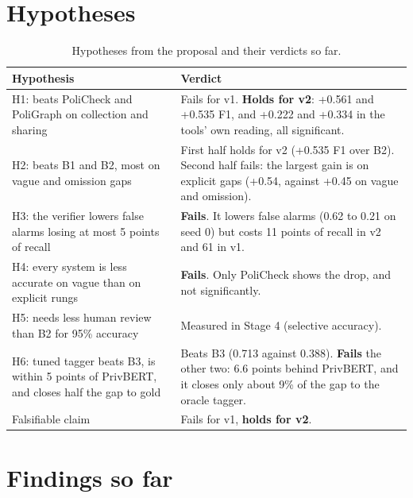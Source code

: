 \documentclass[11pt,a4paper]{article}
\begin{document}
\section{Hypotheses}
\label{sec:hyp}

\begin{table}[H]
\centering
\small
\begin{tabular}{p{6.6cm}p{8.2cm}}
\toprule
Hypothesis & Verdict \\
\midrule
H1: beats PoliCheck and PoliGraph on collection and sharing &
Fails for v1. \textbf{Holds for v2}: +0.561 and +0.535 F1, and +0.222 and +0.334 in the tools'
own reading, all significant. \\
H2: beats B1 and B2, most on vague and omission gaps &
First half holds for v2 (+0.535 F1 over B2). Second half fails: the largest gain is on explicit
gaps (+0.54, against +0.45 on vague and omission). \\
H3: the verifier lowers false alarms losing at most 5 points of recall &
\textbf{Fails}. It lowers false alarms (0.62 to 0.21 on seed 0) but costs 11 points of recall in
v2 and 61 in v1. \\
H4: every system is less accurate on vague than on explicit rungs &
\textbf{Fails}. Only PoliCheck shows the drop, and not significantly. \\
H5: needs less human review than B2 for 95\% accuracy &
Measured in Stage 4 (selective accuracy). \\
H6: tuned tagger beats B3, is within 5 points of PrivBERT, and closes half the gap to gold &
Beats B3 (0.713 against 0.388). \textbf{Fails} the other two: 6.6 points behind PrivBERT, and it
closes only about 9\% of the gap to the oracle tagger. \\
Falsifiable claim & Fails for v1, \textbf{holds for v2}. \\
\bottomrule
\end{tabular}
\caption{Hypotheses from the proposal and their verdicts so far.}
\end{table}

\section{Findings so far}
\end{document}
